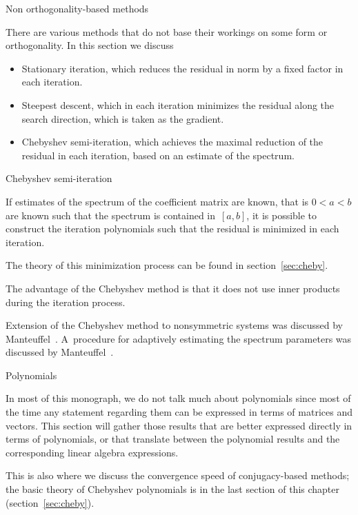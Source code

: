 \documentclass[11pt]{artikel3}
\begin{document}
\begin{Outline}


 {Non orthogonality-based methods}
\FurtherReading

There are various methods that do not base their workings on some form
or orthogonality. In this section we discuss
\begin{itemize}
\item Stationary iteration, which reduces the residual in norm by a
  fixed factor in each iteration.
\item Steepest descent, which in each iteration minimizes the residual
  along the search direction, which is taken as the gradient.
\item Chebyshev semi-iteration, which achieves the maximal reduction
  of the residual in each iteration, based on an estimate of the
  spectrum.
\end{itemize}




 {Chebyshev semi-iteration}

If estimates of the spectrum of the coefficient matrix are known, that
is $0<a<b$ are known such that the spectrum is contained in~$[a,b]$,
it is possible to construct the iteration polynomials such that the
residual is minimized in each iteration. 

The theory of this minimization process can be found in
section~\ref{sec:cheby}.

The advantage of the Chebyshev method is that it does not use inner
products during the iteration process.

Extension of the Chebyshev method to nonsymmetric systems was
discussed by Manteuffel~\cite{Ma:chebyshev}. A~procedure for
adaptively estimating the spectrum parameters was discussed by
Manteuffel~\cite{Ma:adaptive}.

 {Polynomials}

In most of this monograph, we do not talk much about polynomials
since most of the time any statement regarding them can be expressed
in terms of matrices and vectors. This section will gather those results
that are better expressed directly in terms of polynomials, or that
translate between the polynomial results and the corresponding
linear algebra expressions.

This is also where we discuss the convergence speed of conjugacy-based
methods; the basic theory of Chebyshev polynomials is in the last
section of this chapter (section~\ref{sec:cheby}).


\end{Outline}
\end{document}
